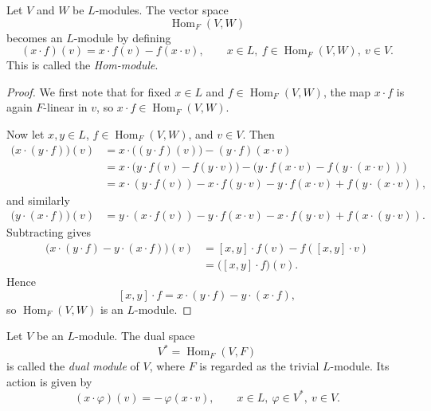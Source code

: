 \begin{definition}
    Let \(V\) and \(W\) be \(L\)-modules. The vector space
    \[
        \operatorname{Hom}_F(V,W)
    \]
    becomes an \(L\)-module by defining
    \[
        (x\cdot f)(v)=x\cdot f(v)-f(x\cdot v),
        \qquad x\in L,\ f\in \operatorname{Hom}_F(V,W),\ v\in V.
    \]
    This is called the \emph{Hom-module}.
\end{definition}

\begin{proof}
    We first note that for fixed \(x\in L\) and \(f\in \operatorname{Hom}_F(V,W)\),
    the map \(x\cdot f\) is again \(F\)-linear in \(v\), so \(x\cdot f\in \operatorname{Hom}_F(V,W)\).

    Now let \(x,y\in L\), \(f\in \operatorname{Hom}_F(V,W)\), and \(v\in V\). Then
    \begin{align*}
        \bigl(x\cdot (y\cdot f)\bigr)(v)
         & =x\cdot \bigl((y\cdot f)(v)\bigr)-(y\cdot f)(x\cdot v)                            \\
         & =x\cdot \bigl(y\cdot f(v)-f(y\cdot v)\bigr)
        -\bigl(y\cdot f(x\cdot v)-f(y\cdot (x\cdot v))\bigr)                                 \\
         & =x\cdot (y\cdot f(v))-x\cdot f(y\cdot v)-y\cdot f(x\cdot v)+f(y\cdot (x\cdot v)),
    \end{align*}
    and similarly
    \begin{align*}
        \bigl(y\cdot (x\cdot f)\bigr)(v)
         & =y\cdot (x\cdot f(v))-y\cdot f(x\cdot v)-x\cdot f(y\cdot v)+f(x\cdot (y\cdot v)).
    \end{align*}
    Subtracting gives
    \begin{align*}
        \bigl(x\cdot (y\cdot f)-y\cdot (x\cdot f)\bigr)(v)
         & =[x,y]\cdot f(v)-f([x,y]\cdot v) \\
         & =\bigl([x,y]\cdot f\bigr)(v).
    \end{align*}
    Hence
    \[
        [x,y]\cdot f=x\cdot (y\cdot f)-y\cdot (x\cdot f),
    \]
    so \(\operatorname{Hom}_F(V,W)\) is an \(L\)-module.
\end{proof}

\begin{definition}
    Let \(V\) be an \(L\)-module. The dual space
    \[
        V^*=\operatorname{Hom}_F(V,F)
    \]
    is called the \emph{dual module} of \(V\), where \(F\) is regarded as the trivial
    \(L\)-module. Its action is given by
    \[
        (x\cdot \varphi)(v)=-\,\varphi(x\cdot v),
        \qquad x\in L,\ \varphi\in V^*,\ v\in V.
    \]
\end{definition}

